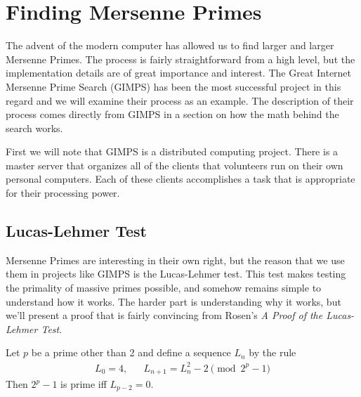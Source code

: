 \section{Finding Mersenne Primes}


The advent of the modern computer has allowed us to find larger and larger Mersenne Primes.  The process is fairly straightforward from a high level, but the implementation details are of great importance and interest. The Great Internet Mersenne Prime Search (GIMPS) has been the most successful project in this regard and we will examine their process as an example.  The description of their process comes directly from GIMPS \cite{gimps} in a section on how the math behind the search works. 

First we will note that GIMPS is a distributed computing project.  There is a master server that organizes all of the clients that volunteers run on their own personal computers.  Each of these clients accomplishes a task that is appropriate for their processing power.  %

\subsection{Lucas-Lehmer Test}

Mersenne Primes are interesting in their own right, but the reason that we use them in projects like GIMPS is the Lucas-Lehmer test.  This test makes testing the primality of massive primes possible, and somehow remains simple to understand how it works.  The harder part is understanding why it works, but we'll present a proof that is fairly convincing from Rosen's \emph{A Proof of the Lucas-Lehmer Test}\cite{rosen}.


\begin{thm} 
Let $p$ be a prime other than 2 and define a sequence $L_n$ by the rule
\begin{align}
\label{eqn:llt}
L_0 = 4,&&L_{n+1} = L_n^2 - 2 \pmod{2^p - 1}
\end{align}
Then $2^p - 1$ is prime iff $L_{p-2} = 0$.
\end{thm}

